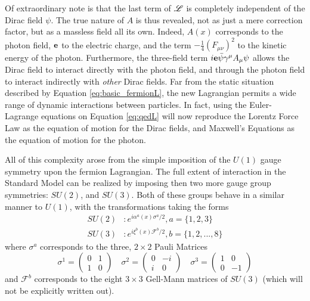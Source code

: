     Of extraordinary note is that the last term of $\mathscr{L}$ is completely independent of the Dirac field $\psi$.
    The true nature of $A$ is thus revealed, not as just a mere correction factor,
        but as a massless field all its own.
    Indeed, $A(x)$ corresponds to the photon field, $\mathbf{e}$ to the electric charge,
        and the term $-\frac{1}{4}(F_{\mu\nu})^2$ to the kinetic energy of the photon.
    Furthermore, the three-field term $i \mathbf{e} \bar{\psi} \gamma^\mu A_\mu \psi$
        allows the Dirac field to interact directly with the photon field,
        and through the photon field to interact indirectly with \textit{other} Dirac fields.
    Far from the static situation described by Equation \ref{eq:basic_fermionL},
        the new Lagrangian permits a wide range of dynamic interactions between particles.
    In fact, using the Euler-Lagrange equations on Equation \ref{eq:qedL}
        will now reproduce the Lorentz Force Law as the equation of motion for the Dirac fields,
        and Maxwell's Equations as the equation of motion for the photon.

    All of this complexity arose from the simple imposition of the $U(1)$ gauge symmetry upon the fermion Lagrangian.
    The full extent of interaction in the Standard Model can be realized by imposing then two more gauge group symmetries:
        $SU(2)$, and $SU(3)$.
    Both of these groups behave in a similar manner to $U(1)$, with the transformations taking the forms
    \begin{equation} \begin{split}
        SU(2)&: e^{i \alpha^a(x) \sigma^a / 2}, a=\{1,2,3\}
        \\SU(3)&: e^{i \xi^b(x) \mathscr{F}^b / 2}, b=\{1,2, ..., 8\}
    \end{split} \end{equation}
    where $\sigma^a$ corresponds to the three, $2 \times 2$ Pauli Matrices
    \begin{equation}
        \sigma^1 = \begin{pmatrix} 0 & 1 \\ 1 & 0 \end{pmatrix} \quad
        \sigma^2 = \begin{pmatrix} 0 & -i \\ i & 0 \end{pmatrix} \quad
        \sigma^3 = \begin{pmatrix} 1 & 0 \\ 0 & -1 \end{pmatrix}
    \end{equation}
    and $\mathscr{F}^b$ corresponds to the eight $3 \times 3$ Gell-Mann matrices of $SU(3)$
        (which will not be explicitly written out).

